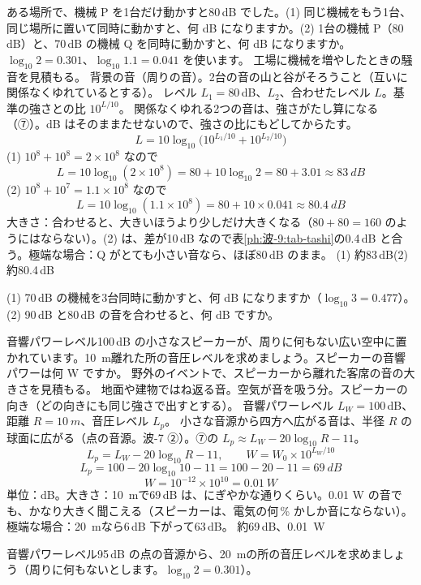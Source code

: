 \begin{phreidai}[機械の音を合わせる]
\label{ph:波-9:ex9}ある場所で、機械 P を1台だけ動かすと80\,dB でした。(1) 同じ機械をもう1台、同じ場所に置いて同時に動かすと、何 dB になりますか。(2) 1台の機械 P（80\,dB）と、70\,dB の機械 Q を同時に動かすと、何 dB になりますか。$\log_{10}2=0.301$、$\log_{10}1.1=0.041$ を使います。
\phbamen
工場に機械を増やしたときの騒音を見積もる。
\phmushi
背景の音（周りの音）。2台の音の山と谷がそろうこと（互いに関係なくゆれているとする）。
\phzu
レベル $L_1=80$\,dB、$L_2$、合わせたレベル $L$。基準の強さとの比 $10^{L/10}$。
\phriyu
関係なくゆれる2つの音は、強さがたし算になる（⑦）。dB はそのままたせないので、強さの比にもどしてからたす。
\phtateru
\[ L=10\log_{10}\bigl(10^{L_1/10}+10^{L_2/10}\bigr) \]
\phtoku
(1) $10^{8}+10^{8}=2\times10^8$ なので
\[ L=10\log_{10}(2\times10^8)=80+10\log_{10}2=80+3.01\approx\qty{83}{dB} \]
(2) $10^{8}+10^{7}=1.1\times10^8$ なので
\[ L=10\log_{10}(1.1\times10^8)=80+10\times0.041\approx\qty{80.4}{dB} \]
\phtashikame
大きさ：合わせると、大きいほうより少しだけ大きくなる（$80+80=160$ のようにはならない）。(2) は、差が10\,dB なので表\ref{ph:波-9:tab-tashi}の0.4\,dB と合う。極端な場合：Q がとても小さい音なら、ほぼ80\,dB のまま。
\kotae (1) 約83\,dB\quad (2) 約80.4\,dB
\end{phreidai}
\begin{jibun}
(1) 70\,dB の機械を3台同時に動かすと、何 dB になりますか（$\log_{10}3=0.477$）。(2) 90\,dB と80\,dB の音を合わせると、何 dB ですか。
\end{jibun}

\begin{phreidai}[スピーカーから離れた所の音]
\label{ph:波-9:ex10}音響パワーレベル100\,dB の小さなスピーカーが、周りに何もない広い空中に置かれています。\qty{10}{m}離れた所の音圧レベルを求めましょう。スピーカーの音響パワーは何 W ですか。
\phbamen
野外のイベントで、スピーカーから離れた客席の音の大きさを見積もる。
\phmushi
地面や建物ではね返る音。空気が音を吸う分。スピーカーの向き（どの向きにも同じ強さで出すとする）。
\phzu
音響パワーレベル $L_W=100$\,dB、距離 $R=\qty{10}{m}$、音圧レベル $L_p$。
\phriyu
小さな音源から四方へ広がる音は、半径 $R$ の球面に広がる（点の音源。波-7 ②）。⑦の $L_p\approx L_W-20\log_{10}R-11$。
\phtateru
\[ L_p=L_W-20\log_{10}R-11,\qquad W=W_0\times10^{L_W/10} \]
\phtoku
\[ L_p=100-20\log_{10}10-11=100-20-11=\qty{69}{dB} \]
\[ W=10^{-12}\times10^{10}=\qty{0.01}{W} \]
\phtashikame
単位：dB。大きさ：\qty{10}{m}で69\,dB は、にぎやかな通りくらい。0.01 W の音でも、かなり大きく聞こえる（スピーカーは、電気の何\,\% かしか音にならない）。極端な場合：\qty{20}{m}なら6\,dB 下がって63\,dB。
\kotae 約69\,dB、\qty{0.01}{W}
\end{phreidai}
\begin{jibun}
音響パワーレベル95\,dB の点の音源から、\qty{20}{m}の所の音圧レベルを求めましょう（周りに何もないとします。$\log_{10}2=0.301$）。
\end{jibun}

